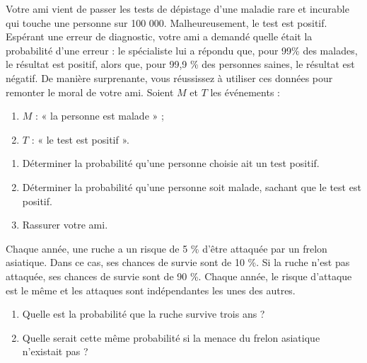 \documentclass[a4paper,11pt,exos]{nsi} %
\begin{document}
\exo{}
Votre ami vient de passer les tests de dépistage d'une maladie rare et incurable qui touche une personne sur 100 000. Malheureusement, le test est positif. Espérant une erreur de diagnostic, votre ami a demandé quelle était la probabilité d'une erreur : le spécialiste lui a répondu que, pour 99\% des malades, le résultat est positif, alors que, pour 99,9 \% des personnes saines, le résultat est négatif.
De manière surprenante, vous réussissez à utiliser ces données pour remonter le moral de votre ami.
Soient $M$ et $T$ les événements :
\begin{enumerate}[label=\textbullet]
    \item $M$ : « la personne est malade » ;
    \item $T$ : « le test est positif ».
\end{enumerate}
\begin{enumerate}
    \item Déterminer la probabilité qu'une personne choisie ait un test positif.
    \item Déterminer la probabilité qu'une personne soit malade, sachant que le test est positif.
    \item Rassurer votre ami.
\end{enumerate}

\exo{}
Chaque année, une ruche a un risque de 5 \% d'être attaquée par un frelon asiatique. Dans ce cas, ses chances de survie sont de 10 \%. Si la ruche n'est pas attaquée, ses chances de survie sont de 90 \%. Chaque année, le risque d'attaque est le même et les attaques sont indépendantes les unes des autres.
\begin{enumerate}
    \item Quelle est la probabilité que la ruche survive trois ans ?
    \item Quelle serait cette même probabilité si la menace du frelon asiatique n'existait pas ?
\end{enumerate}
\end{document}
